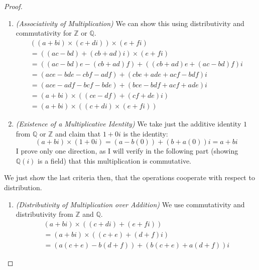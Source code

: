 \documentclass[12pt]{article}
\newenvironment{sol}[1][Solution]{\begin{trivlist}
\item[\hskip \labelsep {\bfseries #1:}]}{\end{trivlist}}
\begin{document}
\begin{sol}
\begin{proof}
        \begin{enumerate}
            \item \textit{(Associativity of Multiplication)} We can show this using distributivity and commutativity for $\mathbb{Z}$ or $\mathbb{Q}$.
            \begin{equation}
                \begin{aligned}
                    ((a + bi) \times (c + di)) \times (e + fi)
                    \\ = ((ac - bd) + (cb + ad)i) \times (e + fi)
                    \\ = ((ac - bd)e - (cb + ad)f) + ((cb + ad)e + (ac - bd)f)i
                    \\ = (ace - bde - cbf - adf) + (cbe + ade + acf - bdf)i
                    \\ = (ace - adf - bcf - bde) + (bce - bdf + acf + ade)i
                    \\ = (a + bi) \times ((ce - df) + (cf + de)i)
                    \\ = (a + bi) \times ((c + di) \times (e + fi))
                \end{aligned}
            \end{equation}
            \item \textit{(Existence of a Multiplicative Identity)} We take just the additive identity $1$ from $\mathbb{Q}$ or $\mathbb{Z}$ and claim that $1 + 0i$ is the identity:
            \begin{equation}
                (a + bi) \times (1 + 0i) = (a - b(0)) + (b + a(0))i = a + bi
            \end{equation}
            I prove only one direction, as I will verify in the following part (showing $\mathbb{Q}(i)$ is a field) that this multiplication is commutative.
        \end{enumerate}
        We just show the last criteria then, that the operations cooperate with respect to distribution.
        \begin{enumerate}
            \item \textit{(Distributivity of Multiplication over Addition)} We use commutativity and distributivity from $\mathbb{Z}$ and $\mathbb{Q}$.
            \begin{equation}
                \begin{aligned}
                    (a + bi) \times ((c + di) + (e + fi))
                    \\ = (a + bi) \times ((c + e) + (d + f)i)
                    \\ = (a(c +e) - b(d + f)) + (b(c + e) + a(d + f))i

\end{aligned}
\end{equation}
\end{enumerate}
\end{proof}
\end{sol}
\end{document}
